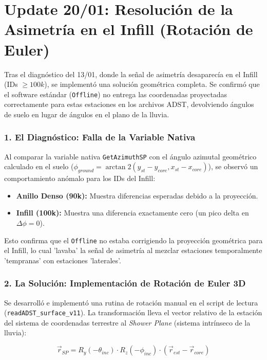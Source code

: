 \section*{Update 20/01: Resolución de la Asimetría en el Infill (Rotación de Euler)}

Tras el diagnóstico del 13/01, donde la señal de asimetría desaparecía en el Infill (IDs $\ge 100k$), se implementó una solución geométrica completa. Se confirmó que el software estándar (\texttt{Offline}) no entrega las coordenadas proyectadas correctamente para estas estaciones en los archivos ADST, devolviendo ángulos de suelo en lugar de ángulos en el plano de la lluvia.

\subsubsection*{1. El Diagnóstico: Falla de la Variable Nativa}
Al comparar la variable nativa \texttt{GetAzimuthSP} con el ángulo azimutal geométrico calculado en el suelo ($\phi_{ground} = \arctan2(y_{st}-y_{core}, x_{st}-x_{core})$), se observó un comportamiento anómalo para los IDs del Infill:
\begin{itemize}
	\item \textbf{Anillo Denso (90k):} Muestra diferencias esperadas debido a la proyección.
	\item \textbf{Infill (100k):} Muestra una diferencia exactamente cero (un pico delta en $\Delta\phi = 0$).
\end{itemize}
Esto confirma que el \texttt{Offline} no estaba corrigiendo la proyección geométrica para el Infill, lo cual 'lavaba' la señal de asimetría al mezclar estaciones temporalmente 'tempranas' con estaciones 'laterales'.

\subsubsection*{2. La Solución: Implementación de Rotación de Euler 3D}
Se desarrolló e implementó una rutina de rotación manual en el script de lectura (\texttt{readADST\_surface\_v11}). La transformación lleva el vector relativo de la estación del sistema de coordenadas terrestre al \textit{Shower Plane} (sistema intrínseco de la lluvia):

\begin{equation}
	\vec{r}_{SP} = R_y(-\theta_{inc}) \cdot R_z(-\phi_{inc}) \cdot (\vec{r}_{est} - \vec{r}_{core})
\end{equation}

